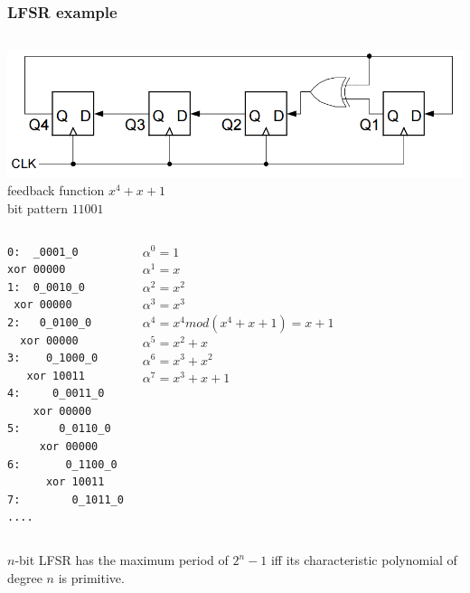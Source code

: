 \documentclass[10pt, compress]{beamer}
\begin{document}

\iffalse 
\begin{frame}[fragile]
\frametitle{LFSR example}
\begin{columns}
\includegraphics[scale=0.3]{galex}
feedback function $x^4+x+1$\\
bit pattern $11001$
\end{columns}
\begin{columns}
\begin{lstlisting}
0:  _0001_0
xor 00000
1:  0_0010_0 
 xor 00000
2:   0_0100_0
  xor 00000
3:    0_1000_0
   xor 10011
4:     0_0011_0
    xor 00000
5:      0_0110_0
     xor 00000
6:       0_1100_0
      xor 10011
7:        0_1011_0
....
\end{lstlisting}
$\alpha^0=1$\\
$\alpha^1=x$\\
$\alpha^2=x^2$\\
$\alpha^3=x^3$\\
$\alpha^4=x^4 mod(x^4+x+1)=x+1$\\
$\alpha^5=x^2+x$\\
$\alpha^6=x^3+x^2$\\
$\alpha^7=x^3+x+1$
\end{columns}
$n$-bit LFSR has the maximum period of $2^{n}-1$ iff its characteristic polynomial of degree $n$ is primitive.
\end{frame}
\end{document}
